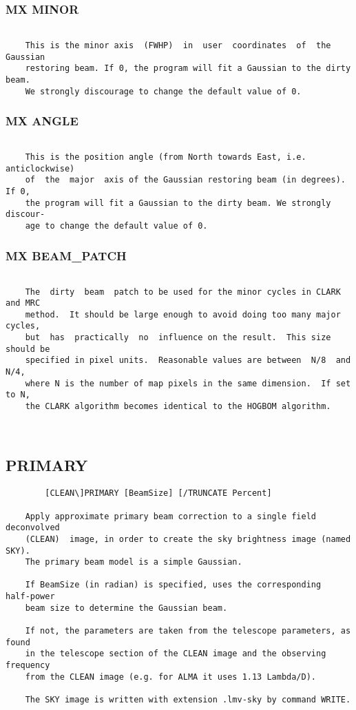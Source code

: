 \subsubsection{MX MINOR}
\begin{verbatim}

    This is the minor axis  (FWHP)  in  user  coordinates  of  the  Gaussian
    restoring beam. If 0, the program will fit a Gaussian to the dirty beam.
    We strongly discourage to change the default value of 0.

\end{verbatim}
\subsubsection{MX ANGLE}
\begin{verbatim}

    This is the position angle (from North towards East, i.e. anticlockwise)
    of  the  major  axis of the Gaussian restoring beam (in degrees).  If 0,
    the program will fit a Gaussian to the dirty beam. We strongly  discour-
    age to change the default value of 0.

\end{verbatim}
\subsubsection{MX BEAM\_PATCH}
\begin{verbatim}

    The  dirty  beam  patch to be used for the minor cycles in CLARK and MRC
    method.  It should be large enough to avoid doing too many major cycles,
    but  has  practically  no  influence on the result.  This size should be
    specified in pixel units.  Reasonable values are between  N/8  and  N/4,
    where N is the number of map pixels in the same dimension.  If set to N,
    the CLARK algorithm becomes identical to the HOGBOM algorithm.



\end{verbatim}
\subsection{PRIMARY}
\begin{verbatim}
        [CLEAN\]PRIMARY [BeamSize] [/TRUNCATE Percent]

    Apply approximate primary beam correction to a single field  deconvolved
    (CLEAN)  image, in order to create the sky brightness image (named SKY).
    The primary beam model is a simple Gaussian.

    If BeamSize (in radian) is specified, uses the corresponding  half-power
    beam size to determine the Gaussian beam.

    If not, the parameters are taken from the telescope parameters, as found
    in the telescope section of the CLEAN image and the observing  frequency
    from the CLEAN image (e.g. for ALMA it uses 1.13 Lambda/D).

    The SKY image is written with extension .lmv-sky by command WRITE.


\end{verbatim}

